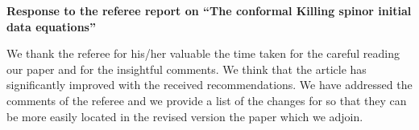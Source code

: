 \documentclass[a4paper,10pt]{article}
\theoremstyle{plain}
\newcommand{\myrule} [3] []{
    \begin{center}
        \begin{tikzpicture}
            \draw[#2-#3, ultra thick, #1] (0,0) to (0.5\linewidth,0);
        \end{tikzpicture}
    \end{center}
}
\renewcommand{\title}[1]{{\bfseries #1}\par}
\renewcommand{\author}[1]{\medskip{#1}\par\smallskip}
\newcommand{\affiliation}[1]{{\itshape #1}\par}
\newcommand{\email}[1]{E-mail:~\texttt{#1}\par}
\numberwithin{equation}{section}
\begin{document}
\begin{center}
  \title{\LARGE Response to the referee report on ``The conformal Killing spinor initial data equations''
  \\ \vspace{0.5cm} \Large
  }
\vspace{3mm}
\author{\large }

\vspace{1mm}
\end{center}

%
\vspace{2mm}

 
%
%
%

We thank the referee for his/her valuable the time taken
for the careful reading our paper and for the insightful comments. We think that the article has significantly improved
with the received recommendations. We have addressed the comments of the referee and we provide a list of the changes for so that
they can be more easily located in the revised version the paper which we adjoin.
\end{document}
